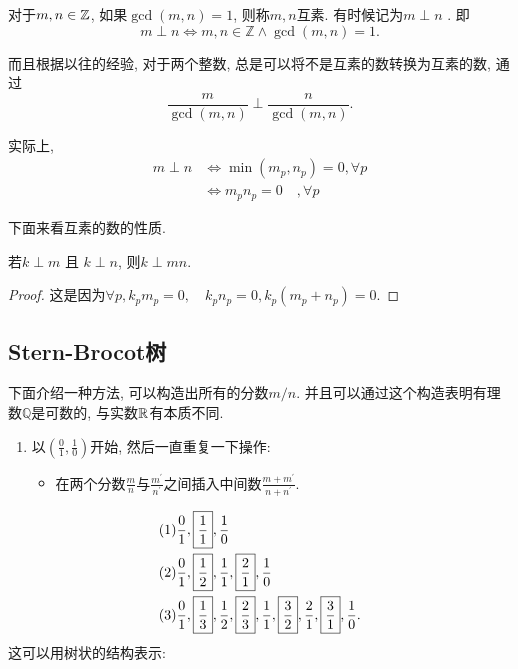 \documentclass{ctexart}
\begin{document}
\begin{definition} 对于$m, n\in {\mathbb Z}$, 如果$\gcd(m,n)=1$, 则称$m, n$互素. 有时候记为$m \perp n$
.    
即$$m \perp n \Leftrightarrow m, n \in \mathbb{Z} \wedge \operatorname{gcd}(m, n)=1.$$
\end{definition}

而且根据以往的经验, 对于两个整数, 总是可以将不是互素的数转换为互素的数, 通过$$\frac{m}{\operatorname{gcd}(m, n)} \perp \frac{n}{\operatorname{gcd}(m, n)}.$$

实际上, $$\begin{aligned} m \perp n & \Leftrightarrow \min \left(m_p, n_p\right)=0, \forall p \\ & \Leftrightarrow m_p n_p=0 \quad, \forall p\end{aligned}$$

下面来看互素的数的性质. 

\begin{prop} 若$k \perp m$ 且 $k \perp n$, 则$k \perp mn$. 
    
\end{prop}

\begin{proof}
    这是因为$\forall p, k_p m_p=0, \quad k_p n_p=0, k_p\left(m_p+n_p\right)=0$.
\end{proof}

\subsection{Stern-Brocot树} 下面介绍一种方法, 可以构造出所有的分数$m/n$. 并且可以通过这个构造表明有理数$\mathbb Q$是可数的, 与实数$\mathbb R$有本质不同.  

\begin{enumerate}
    \item 以$\left(\frac{0}{1}, \frac{1}{0}\right)$开始, 然后一直重复一下操作:
        \begin{itemize}
            \item 在两个分数$\frac{m}{n} $与$ \frac{m^{\prime}}{n^{\prime}}$之间插入中间数$\frac{m+m^{\prime}}{n+n^{\prime}}$. 
        \end{itemize}
\end{enumerate}

\begin{example}
    $$
    \begin{aligned}(1) & \frac{0}{1},\text{\fbox{\ensuremath{\frac{1}{1}}}},\frac{1}{0}\\
(2) & \frac{0}{1},\text{\fbox{\ensuremath{\frac{1}{2}}}},\frac{1}{1},\text{\fbox{\ensuremath{\frac{2}{1}}}},\frac{1}{0}\\
(3) & \frac{0}{1},\text{\fbox{\ensuremath{\frac{1}{3}}}},\frac{1}{2},\text{\fbox{\ensuremath{\frac{2}{3}}}},\frac{1}{1},\text{\fbox{\ensuremath{\frac{3}{2}}}},\frac{2}{1},\text{\fbox{\ensuremath{\frac{3}{1}}}},\frac{1}{0}.
\end{aligned}
    $$
    这可以用树状的结构表示: 
\end{example}
\end{document}
